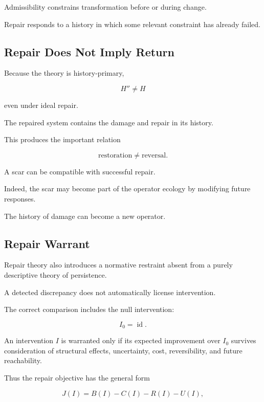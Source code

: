 \documentclass[11pt]{article}
\theoremstyle{remark}
\begin{document}
Admissibility constrains transformation before or during change.

Repair responds to a history in which some relevant constraint has already failed.

\subsection{Repair Does Not Imply Return}

Because the theory is history-primary,

\begin{equation}
H''\neq H
\end{equation}

even under ideal repair.

The repaired system contains the damage and repair in its history.

This produces the important relation

\begin{equation}
\boxed{
\text{restoration}
\neq
\text{reversal}.
}
\end{equation}

A scar can be compatible with successful repair.

Indeed, the scar may become part of the operator ecology by modifying future responses.

The history of damage can become a new operator.

\subsection{Repair Warrant}

Repair theory also introduces a normative restraint absent from a purely descriptive theory of persistence.

A detected discrepancy does not automatically license intervention.

The correct comparison includes the null intervention:

\begin{equation}
I_0=\operatorname{id}.
\end{equation}

An intervention $I$ is warranted only if its expected improvement over $I_0$ survives consideration of structural effects, uncertainty, cost, reversibility, and future reachability.

Thus the repair objective has the general form

\begin{equation}
J(I)
=
B(I)
-
C(I)
-
R(I)
-
U(I),
\end{equation}
\end{document}
